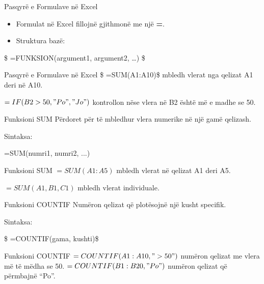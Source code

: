 \documentclass[
  ignorenonframetext,
]{beamer}
\newenvironment{Shaded}{\begin{snugshade}}{\end{snugshade}}
\newcommand{\NormalTok}[1]{#1}
\begin{document}
\begin{frame}{Pasqyrë e Formulave në Excel}
\label{pasqyruxeb-e-formulave-nuxeb-excel}
\begin{itemize}
\item
  Formulat në Excel fillojnë gjithmonë me një \textbf{=}.
\item
  Struktura bazë:
\end{itemize}

\$ =FUNKSION(argument1, argument2, \ldots) \$
\end{frame}

\begin{frame}{Pasqyrë e Formulave në Excel}
\label{pasqyruxeb-e-formulave-nuxeb-excel-1}
\$ =SUM(A1:A10)\$ mbledh vlerat nga qelizat A1 deri në A10.

\(=IF(B2>50, "Po", "Jo")\) kontrollon nëse vlera në B2 është më e madhe
se 50.
\end{frame}

\begin{frame}[fragile]{Funksioni SUM}
\label{funksioni-sum}
Përdoret për të mbledhur vlera numerike në një gamë qelizash.

Sintaksa:

\begin{Shaded}
\begin{Highlighting}[]
\NormalTok{=SUM(numri1, numri2, ...)}
\end{Highlighting}
\end{Shaded}
\end{frame}

\begin{frame}{Funksioni SUM}
\label{funksioni-sum-1}
\(=SUM(A1:A5)\) mbledh vlerat në qelizat A1 deri A5.

\(=SUM(A1, B1, C1)\) mbledh vlerat individuale.
\end{frame}

\begin{frame}{Funksioni COUNTIF}
\label{funksioni-countif}
Numëron qelizat që plotësojnë një kusht specifik.

Sintaksa:

\$ =COUNTIF(gama, kushti)\$
\end{frame}

\begin{frame}{Funksioni COUNTIF}
\label{funksioni-countif-1}
\(=COUNTIF(A1:A10, ">50")\) numëron qelizat me vlera më të mëdha se 50.
\(=COUNTIF(B1:B20, "Po")\) numëron qelizat që përmbajnë ``Po''.
\end{frame}
\end{document}
